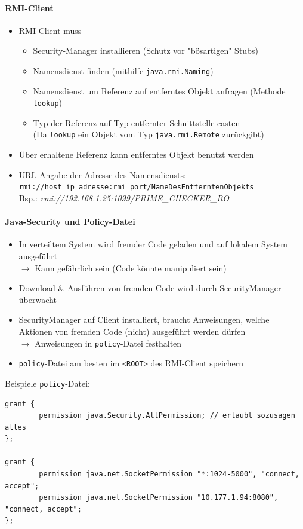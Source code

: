 \documentclass[a4paper]{article}
\begin{document}
			\newpage
			
				\paragraph{RMI-Client}
				
					\begin{itemize}
						\item RMI-Client muss
							\begin{itemize}
								\item Security-Manager installieren (Schutz vor "bösartigen" Stubs)
								\item Namensdienst finden (mithilfe \texttt{java.rmi.Naming})
								\item Namensdienst um Referenz auf entferntes Objekt anfragen (Methode \texttt{lookup})
								\item Typ der Referenz auf Typ entfernter Schnittstelle casten\\
								(Da \texttt{lookup} ein Objekt vom Typ \texttt{java.rmi.Remote} zurückgibt)
							\end{itemize}
						\item Über erhaltene Referenz kann entferntes Objekt benutzt werden
						\item URL-Angabe der Adresse des Namensdiensts:\\
						\texttt{rmi://host\_ip\_adresse:rmi\_port/NameDesEntferntenObjekts}\\
						Bsp.: \textit{rmi://192.168.1.25:1099/PRIME\_CHECKER\_RO}
					\end{itemize}
			
				\paragraph{Java-Security und Policy-Datei}
				
					\begin{itemize}
						\item In verteiltem System wird fremder Code geladen und auf lokalem System ausgeführt\\
						$\rightarrow$ Kann gefährlich sein (Code könnte manipuliert sein)
						\item Download \& Ausführen von fremden Code wird durch SecurityManager überwacht
						\item SecurityManager auf Client installiert, braucht Anweisungen, welche Aktionen von fremden Code (nicht) ausgeführt werden dürfen\\
						$\rightarrow$ Anweisungen in \texttt{policy}-Datei festhalten
						\item \texttt{policy}-Datei am besten im \texttt{<ROOT>} des RMI-Client speichern
					\end{itemize}
					Beispiele \texttt{policy}-Datei:
					\begin{lstlisting}
grant {
		permission java.Security.AllPermission; // erlaubt sozusagen alles
};

grant {
		permission java.net.SocketPermission "*:1024-5000", "connect, accept";
		permission java.net.SocketPermission "10.177.1.94:8080", "connect, accept";
};
					\end{lstlisting}
	
\end{document}
